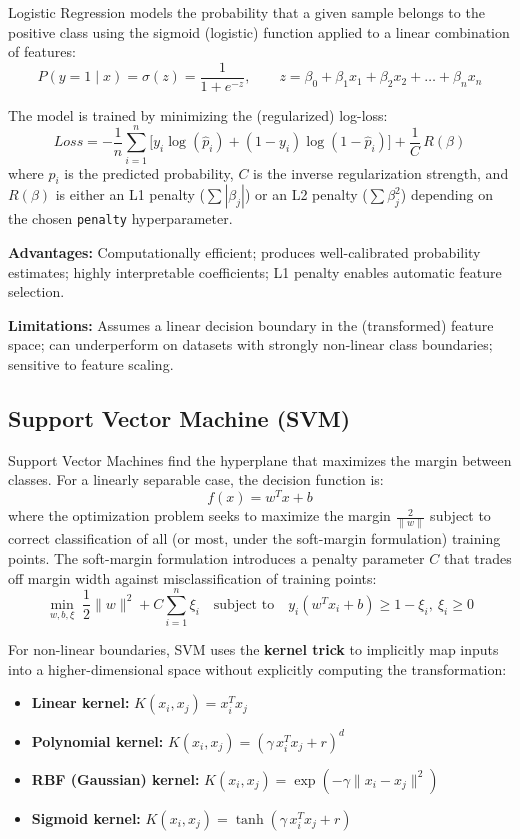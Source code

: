 \documentclass[12pt,a4paper]{article}
\begin{document}
Logistic Regression models the probability that a given sample belongs to the positive class using the sigmoid (logistic) function applied to a linear combination of features:
\[
P(y=1\mid x) = \sigma(z) = \frac{1}{1+e^{-z}}, \qquad z = \beta_0 + \beta_1 x_1 + \beta_2 x_2 + \dots + \beta_n x_n
\]

The model is trained by minimizing the (regularized) log-loss:
\[
Loss = -\frac{1}{n}\sum_{i=1}^{n}\Big[y_i \log(\hat{p}_i) + (1-y_i)\log(1-\hat{p}_i)\Big] + \frac{1}{C}\,R(\beta)
\]
where $\hat{p}_i$ is the predicted probability, $C$ is the inverse regularization strength, and $R(\beta)$ is either an L1 penalty ($\sum|\beta_j|$) or an L2 penalty ($\sum \beta_j^2$) depending on the chosen \texttt{penalty} hyperparameter.

\textbf{Advantages:} Computationally efficient; produces well-calibrated probability estimates; highly interpretable coefficients; L1 penalty enables automatic feature selection.

\textbf{Limitations:} Assumes a linear decision boundary in the (transformed) feature space; can underperform on datasets with strongly non-linear class boundaries; sensitive to feature scaling.

\subsection{Support Vector Machine (SVM)}

Support Vector Machines find the hyperplane that maximizes the margin between classes. For a linearly separable case, the decision function is:
\[
f(x) = w^T x + b
\]
where the optimization problem seeks to maximize the margin $\frac{2}{\|w\|}$ subject to correct classification of all (or most, under the soft-margin formulation) training points. The soft-margin formulation introduces a penalty parameter $C$ that trades off margin width against misclassification of training points:
\[
\min_{w,b,\xi} \; \frac{1}{2}\|w\|^2 + C\sum_{i=1}^{n}\xi_i \quad \text{subject to} \quad y_i(w^Tx_i+b) \geq 1-\xi_i,\ \xi_i \geq 0
\]

For non-linear boundaries, SVM uses the \textbf{kernel trick} to implicitly map inputs into a higher-dimensional space without explicitly computing the transformation:
\begin{itemize}
\item \textbf{Linear kernel:} $K(x_i,x_j) = x_i^T x_j$
\item \textbf{Polynomial kernel:} $K(x_i,x_j) = (\gamma\, x_i^T x_j + r)^d$
\item \textbf{RBF (Gaussian) kernel:} $K(x_i,x_j) = \exp(-\gamma\|x_i-x_j\|^2)$
\item \textbf{Sigmoid kernel:} $K(x_i,x_j) = \tanh(\gamma\, x_i^T x_j + r)$
\end{itemize}
\end{document}
